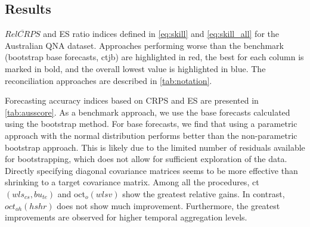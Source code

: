 \documentclass[a4paper,11pt]{article}
\theoremstyle{definition}
\begin{document}
\subsection{Results}\label{ssec:ausresults}
\begin{table}[!t]
	\centering
	\begingroup
	\fontsize{9}{11}\selectfont
	
	\endgroup
	\caption{$\overline{RelCRPS}$ and ES ratio indices defined in \eqref{eq:skill} and \eqref{eq:skill_all} for the Australian QNA dataset. Approaches performing worse than the benchmark (bootstrap base forecasts, ctjb) are highlighted in red, the best for each column is marked in bold, and the overall lowest value is highlighted in blue. The reconciliation approaches are described in \autoref{tab:notation}.}
	\label{tab:ausscore}
	\vspace*{-0.5\baselineskip}
\end{table}

Forecasting accuracy indices based on CRPS and ES are presented in \autoref{tab:ausscore}. As a benchmark approach, we use the base forecasts calculated using the bootstrap method. For base forecasts, we find that using a parametric approach with the normal distribution performs better than the non-parametric bootstrap approach. This is likely due to the limited number of residuals available for bootstrapping, which does not allow for sufficient exploration of the data. Directly specifying diagonal covariance matrices seems to be more effective than shrinking to a target covariance matrix. Among all the procedures, ct$(wls_{cs},bu_{te})$ and oct$_o(wlsv)$ show the greatest relative gains. In contrast, $oct_{oh}(hshr)$ does not show much improvement. Furthermore, the greatest improvements are observed for higher temporal aggregation levels.
\end{document}
